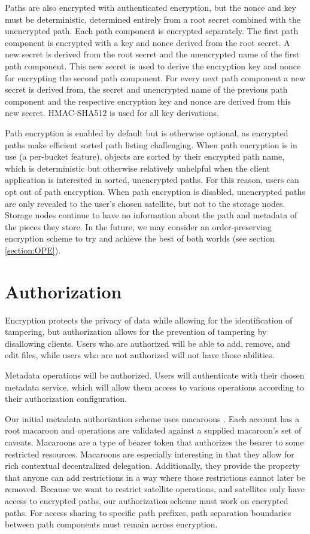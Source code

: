 \documentclass[11pt,fleqn,openany]{book}
\begin{document}
Paths are also encrypted with authenticated encryption, but the nonce and key
must be deterministic, determined entirely from a root secret combined with the
unencrypted path. Each path component is encrypted separately.
The first path component is encrypted with a key and nonce derived from the
root secret. A new secret is derived from the root secret and the unencrypted
name of the first path component. This new secret is used to derive the
encryption key and nonce for encrypting the second path component. For every
next path component a new secret is derived from, the secret and unencrypted
name of the previous path component and the respective encryption key and
nonce are derived from this new secret. HMAC-SHA512 is used for all key
derivations.

Path encryption is enabled by default but is otherwise optional, as encrypted
paths make efficient sorted path listing challenging.
When path encryption is in use (a per-bucket feature),
objects are sorted by their encrypted path name, which is deterministic
but otherwise relatively unhelpful
when the client application is interested in sorted, unencrypted paths.
For this reason, users can opt out of
path encryption. When path encryption is disabled, unencrypted paths
are only revealed to the user's chosen satellite, but not to the storage
nodes. Storage nodes continue to have no information about the path and
metadata of the pieces they store.
In the future, we may consider an order-preserving encryption scheme to try and
achieve the best of both worlds (see section \ref{section:OPE}).

\section{Authorization}\label{sec:concrete-authorization}

Encryption protects the privacy of data while allowing for the identification
of tampering, but authorization allows for the prevention of tampering by
disallowing clients. Users who are authorized will be able to add, remove,
and edit files, while users who are not authorized will not have those abilities.

Metadata operations will be authorized. Users will authenticate with
their chosen metadata service, which will allow them
access to various operations according to their authorization configuration.

Our initial metadata authorization scheme uses macaroons \cite{macaroons}.
Each account has a root macaroon and operations are validated against a supplied
macaroon's set of caveats. Macaroons are a type of bearer token that authorizes
the bearer to some restricted resources. Macaroons are especially interesting
in that they allow for rich contextual decentralized delegation. Additionally, they
provide the property that anyone can add restrictions in a way where those
restrictions cannot later be removed.
Because we want to restrict satellite operations, and satellites only have access
to encrypted paths, our authorization scheme must work on encrypted paths. For
access sharing to specific path prefixes, path separation boundaries between
path components must remain across encryption.
\end{document}
